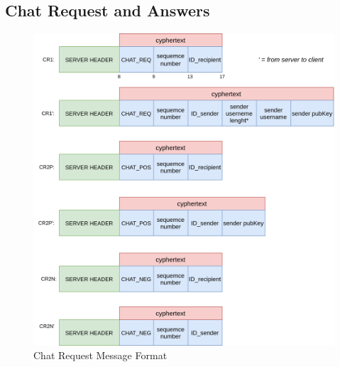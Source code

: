 \documentclass[11pt]{report}
\begin{document}
\subsection*{Chat Request and Answers}
\begin{figure}[H]
	\centering
	\includegraphics[scale=0.28]{img/ChatRequest_messageFormat.png}
	\caption{Chat Request Message Format}
	\label {img: FormatChatRequest}
\end{figure}
\newpage
\end{document}
